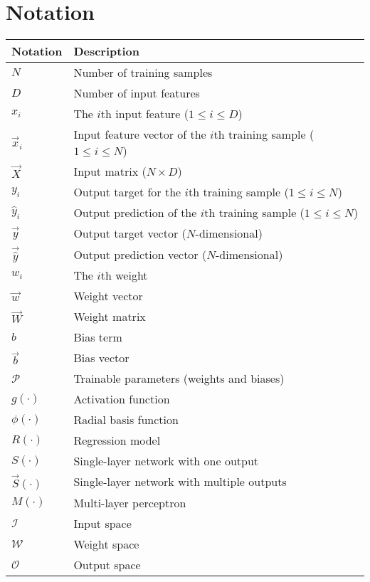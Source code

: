 \chapter*{Notation}
\begin{table}[h!]
    \centering
    \begin{tabular}{l|l}
        \hline
        Notation & Description \\
        \hline
        $N$ & Number of training samples \\
        $D$ & Number of input features \\
        $x_i$ & The $i$th input feature ($1 \leq i \leq D$) \\
        $\vec{x}_i$ & Input feature vector of the $i$th training sample ($1 \leq i \leq N$) \\
        $\vec{X}$ & Input matrix ($N \times D$) \\
        $y_i$ & Output target for the $i$th training sample ($1 \leq i \leq N$) \\
        $\hat{y}_i$ & Output prediction of the $i$th training sample ($1 \leq i \leq N$) \\
        $\vec{y}$ & Output target vector ($N$-dimensional) \\
        $\vec{\hat{y}}$ & Output prediction vector ($N$-dimensional) \\
        $w_i$ & The $i$th weight \\
        $\vec{w}$ & Weight vector \\
        $\vec{W}$ & Weight matrix \\
        $b$ & Bias term \\
        $\vec{b}$ & Bias vector \\
        $\mathscr{P}$ & Trainable parameters (weights and biases) \\
        $g(\cdot)$ & Activation function \\
        $\phi(\cdot)$ & Radial basis function \\
        $R(\cdot)$ & Regression model \\
        $S(\cdot)$ & Single-layer network with one output \\
        $\vec{S}(\cdot)$ & Single-layer network with multiple outputs \\
        $M(\cdot)$ & Multi-layer perceptron \\
        $\mathcal{I}$ & Input space \\
        $\mathcal{W}$ & Weight space \\
        $\mathcal{O}$ & Output space \\

\end{tabular}
\end{table}
